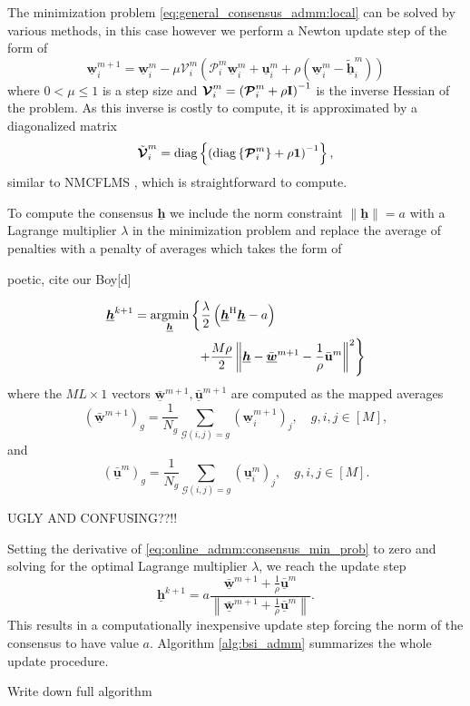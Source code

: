 \documentclass{article}
\newcommand{\uu}{\mtxb{u}}
\newcommand{\hf}{\underline{\bm{h}}}
\newcommand{\wf}{\underline{\bm{w}}}
\newcommand{\uuf}{\underline{\bm{u}}}
\newcommand{\aRhof}{\bm{\mathcal{P}}}
\newcommand{\I}{\mtxb{I}}
\begin{document}
The minimization problem \eqref{eq:general_consensus_admm:local} can be solved by various methods, in this case however we perform a Newton update step of the form of
\begin{equation}
    \wf_i^{m+1} = \wf_i^{m} - \mu \bm{\mathcal{V}}_i^m \left( \aRhof_i^m \wf_i^m + \uuf_i^m + \rho\left(\wf_i^m - \tilde{\hf}_i^{m}\right)\right)\label{eq:online_admm:local_update}
\end{equation}
where \(0  <\mu\leq 1\) is a step size and \(\bm{\mathcal{V}}_i^m = \left(\aRhof_i^m + \rho \I \right)^{-1}\) is the inverse Hessian of the problem.
As this inverse is costly to compute, it is approximated by a diagonalized matrix
\begin{equation}
    \tilde{\bm{\mathcal{V}}}_i^m = \operatorname{diag} \left\{ \left( \operatorname{diag} \left\{ \aRhof_i^m \right\} + \rho \mtxb{1} \right)^{-1}\right\},
\end{equation}
similar to NMCFLMS \cite{}, which is straightforward to compute.

To compute the consensus \(\hf\) we include the norm constraint \(\|\hf\| = a\) with a Lagrange multiplier \(\lambda\) in the minimization problem and replace the average of penalties with a penalty of averages which takes the form of
\begin{attention}
    poetic, cite our Boy[d]
\end{attention}
\begin{align}
    \hf^{k+1} &= \underset{\hf}{\operatorname{argmin}} \left\{ \frac{\lambda}{2} \left(\hf^\herm \hf - a\right)\right.\nonumber\\
    &\left. \qquad \qquad \quad + \frac{M \rho}{2} \left\| \hf - \bar{\wf}^{m+1} - \frac{1}{\rho} \bar{\uu}^{m} \right\|^2 \right\}\label{eq:online_admm:consensus_min_prob}
\end{align}
where the \(M L \times 1\) vectors \(\bar{\wf}^{m+1}, \bar{\uuf}^{m+1}\) are computed as the mapped averages
\begin{equation}
    (\bar{\wf}^{m+1})_g = \frac{1}{N_g} \sum_{\mathcal{G}(i,j)=g} (\wf_i^{m+1})_j,\quad g,i,j \in [M],
\end{equation}
and
\begin{equation}
    (\bar{\uuf}^{m})_g = \frac{1}{N_g} \sum_{\mathcal{G}(i,j)=g} (\uuf_i^{m})_j,\quad g,i,j \in [M].
\end{equation}
\begin{attention}
    UGLY AND CONFUSING??!!
\end{attention}
Setting the derivative of \eqref{eq:online_admm:consensus_min_prob} to zero and solving for the optimal Lagrange multiplier \(\lambda\), we reach the update step
\begin{equation}
    \hf^{k+1} = a\frac{\bar{\wf}^{m+1} + \frac{1}{\rho} \bar{\uuf}^{m} }{\left\| \bar{\wf}^{m+1} + \frac{1}{\rho} \bar{\uuf}^{m} \right\|}.\label{eq:online_admm:consensus_update}
\end{equation}
This results in a computationally inexpensive update step forcing the norm of the consensus to have value \(a\).
Algorithm \ref{alg:bsi_admm} summarizes the whole update procedure.
\begin{attention}
    Write down full algorithm
\end{attention}
\end{document}
